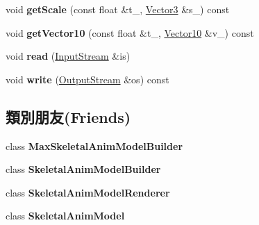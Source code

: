 \begin{DoxyCompactItemize}
\item 
void {\bfseries get\+Scale} (const float \&t\+\_\+, \hyperlink{class_magnum_1_1_vector3}{Vector3} \&s\+\_\+) const \hypertarget{class_magnum_1_1_skeletal_anim_model_1_1_bone_animation_a8a4ad2e1a865cecb12921f27c5bbef7c}{}\label{class_magnum_1_1_skeletal_anim_model_1_1_bone_animation_a8a4ad2e1a865cecb12921f27c5bbef7c}

\item 
void {\bfseries get\+Vector10} (const float \&t\+\_\+, \hyperlink{class_magnum_1_1_vector10}{Vector10} \&v\+\_\+) const \hypertarget{class_magnum_1_1_skeletal_anim_model_1_1_bone_animation_ac9394a232fbf337a4e93f93cf694d033}{}\label{class_magnum_1_1_skeletal_anim_model_1_1_bone_animation_ac9394a232fbf337a4e93f93cf694d033}

\item 
void {\bfseries read} (\hyperlink{class_magnum_1_1_input_stream}{Input\+Stream} \&is)\hypertarget{class_magnum_1_1_skeletal_anim_model_1_1_bone_animation_a908e31edd0035cba68df0e4ec848b1e6}{}\label{class_magnum_1_1_skeletal_anim_model_1_1_bone_animation_a908e31edd0035cba68df0e4ec848b1e6}

\item 
void {\bfseries write} (\hyperlink{class_magnum_1_1_output_stream}{Output\+Stream} \&os) const \hypertarget{class_magnum_1_1_skeletal_anim_model_1_1_bone_animation_a5f975696932315bdcbf5d84bf5128a54}{}\label{class_magnum_1_1_skeletal_anim_model_1_1_bone_animation_a5f975696932315bdcbf5d84bf5128a54}

\end{DoxyCompactItemize}
\subsection*{類別朋友(Friends)}
\begin{DoxyCompactItemize}
\item 
class {\bfseries Max\+Skeletal\+Anim\+Model\+Builder}\hypertarget{class_magnum_1_1_skeletal_anim_model_1_1_bone_animation_a68b08defd5651552ef2b6f922eee7ff9}{}\label{class_magnum_1_1_skeletal_anim_model_1_1_bone_animation_a68b08defd5651552ef2b6f922eee7ff9}

\item 
class {\bfseries Skeletal\+Anim\+Model\+Builder}\hypertarget{class_magnum_1_1_skeletal_anim_model_1_1_bone_animation_a31d58261bc4fbf7a6c1d2d2547437974}{}\label{class_magnum_1_1_skeletal_anim_model_1_1_bone_animation_a31d58261bc4fbf7a6c1d2d2547437974}

\item 
class {\bfseries Skeletal\+Anim\+Model\+Renderer}\hypertarget{class_magnum_1_1_skeletal_anim_model_1_1_bone_animation_ae50fe2cd824b9de98af4dd4aa51d4935}{}\label{class_magnum_1_1_skeletal_anim_model_1_1_bone_animation_ae50fe2cd824b9de98af4dd4aa51d4935}

\item 
class {\bfseries Skeletal\+Anim\+Model}\hypertarget{class_magnum_1_1_skeletal_anim_model_1_1_bone_animation_a88c72f2f6b125ba518843b71080035e5}{}\label{class_magnum_1_1_skeletal_anim_model_1_1_bone_animation_a88c72f2f6b125ba518843b71080035e5}

\end{DoxyCompactItemize}


